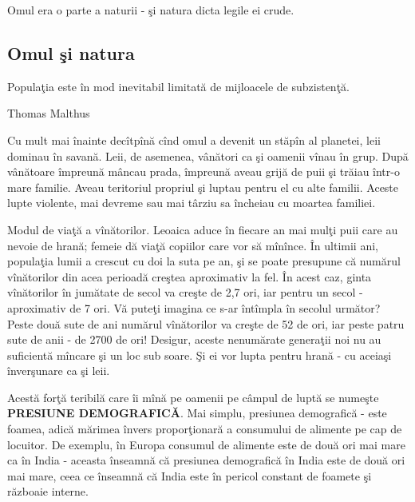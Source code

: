Omul era o parte a naturii - şi natura dicta legile ei crude.
\subsection{Omul şi natura}
\epigraph{Populaţia este în mod inevitabil limitată de mijloacele de subzistenţă.}{Thomas Malthus}

Cu mult mai înainte decîtpînă cînd omul a devenit un stăpîn al planetei, leii dominau în savană. Leii, de asemenea, vânători  ca şi oamenii vînau în grup. După vânătoare împreună mâncau prada,  împreună aveau grijă de  puii şi trăiau într-o mare familie. Aveau teritoriul propriul şi luptau pentru el cu alte familii. Aceste lupte violente, mai devreme sau mai târziu sa încheiau cu moartea familiei.

Modul de viaţă a vînătorilor. Leoaica aduce în fiecare an mai mulţi puii care au nevoie de hrană; femeie dă viaţă copiilor care vor să mînînce. În ultimii ani, populaţia lumii a crescut cu doi la suta pe an, şi se poate presupune că numărul vînătorilor din acea perioadă creştea aproximativ la fel. În acest caz, ginta vînătorilor în jumătate de secol va creşte de 2,7 ori, iar pentru un secol - aproximativ de 7 ori. Vă puteţi imagina ce s-ar întîmpla în secolul următor? Peste două sute de ani numărul vînătorilor va creşte de 52 de ori, iar peste patru sute de anii - de 2700 de ori! Desigur, aceste nenumărate generaţii noi nu au suficientă mîncare şi un loc sub soare. Şi ei vor lupta pentru hrană - cu aceiaşi înverşunare ca şi leii.

Acestă forţă teribilă care îi mînă pe oamenii pe câmpul de luptă se numeşte \textbf{PRESIUNE DEMOGRAFICĂ}. Mai simplu, presiunea demografică - este foamea, adică mărimea învers proporţionară a consumului de alimente pe cap de locuitor. De exemplu, în Europa consumul de alimente este de două ori mai mare ca în India - aceasta înseamnă că presiunea demografică în India este de două ori mai mare, ceea ce înseamnă că India este în pericol constant de foamete şi războaie interne.

